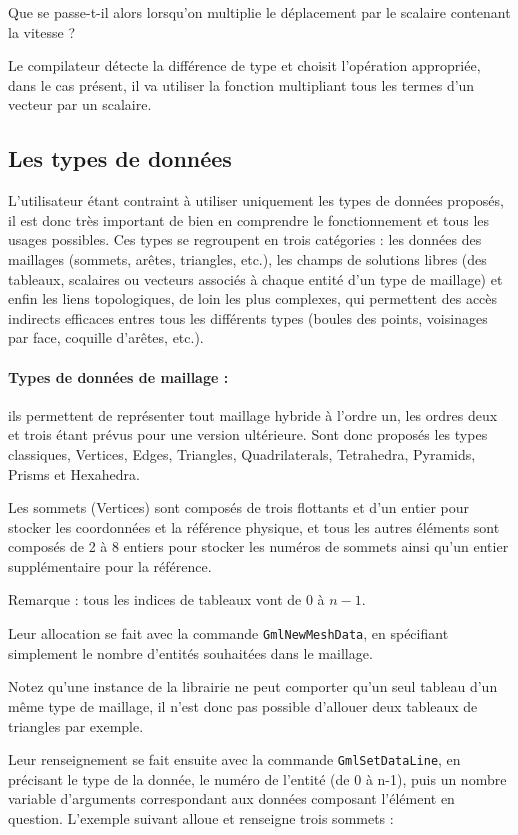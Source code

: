 \documentclass[a4paper,12pt]{article}
\begin{document}
Que se passe-t-il alors lorsqu'on multiplie le déplacement par le scalaire contenant la vitesse ?

Le compilateur détecte la différence de type et choisit l'opération appropriée, dans le cas présent, il va utiliser la fonction multipliant tous les termes d'un vecteur par un scalaire.


\subsection{Les types de données}

L'utilisateur étant contraint à utiliser uniquement les types de données proposés, il est donc très important de bien en comprendre le fonctionnement et tous les usages possibles.
Ces types se regroupent en trois catégories : les données des maillages (sommets, arêtes, triangles, etc.), les champs de solutions libres (des tableaux, scalaires ou vecteurs associés à chaque entité d'un type de maillage) et enfin les liens topologiques, de loin les plus complexes, qui permettent des accès indirects efficaces entres tous les différents types (boules des points, voisinages par face, coquille d'arêtes, etc.).

\paragraph{Types de données de maillage :} ils permettent de représenter tout maillage hybride à l'ordre un, les ordres deux et trois étant prévus pour une version ultérieure.
Sont donc proposés les types classiques, Vertices, Edges, Triangles, Quadrilaterals, Tetrahedra, Pyramids, Prisms et Hexahedra.

Les sommets (Vertices) sont composés de trois flottants et d'un entier pour stocker les coordonnées et la référence physique, et tous les autres éléments sont composés de 2 à 8 entiers pour stocker les numéros de sommets ainsi qu'un entier supplémentaire pour la référence.

Remarque : tous les indices de tableaux vont de $0$ à $n-1$.

Leur allocation se fait avec la commande {\tt GmlNewMeshData}, en spécifiant simplement le nombre d'entités souhaitées dans le maillage.

Notez qu'une instance de la librairie ne peut comporter qu'un seul tableau d'un même type de maillage, il n'est donc pas possible d'allouer deux tableaux de triangles par exemple.

Leur renseignement se fait ensuite avec la commande {\tt GmlSetDataLine}, en précisant le type de la donnée, le numéro de l'entité (de 0 à n-1), puis un nombre variable d'arguments correspondant aux données composant l'élément en question.
L'exemple suivant alloue et renseigne trois sommets :
\end{document}
